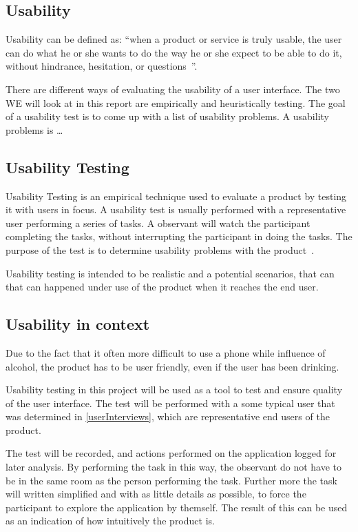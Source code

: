 \subsection{Usability}
\label{sub:usability}

Usability can be defined as: \enquote{when a product or service is truly usable, the user can do what he or she wants to do the way he or she expect to be able to do it, without hindrance, hesitation, or questions~\cite{RubinChisnellSpool08}}.

There are different ways of evaluating the usability of a user interface. The two WE will look at in this report are empirically and heuristically testing. The goal of a usability test is to come up with a list of usability problems. A usability problems is \dots {}

\subsection{Usability Testing}
Usability Testing is an empirical technique used to evaluate a product by testing it with users in focus. A usability test is usually performed with a representative user performing a series of tasks. A observant will watch the participant completing the tasks, without interrupting the participant in doing the tasks. The purpose of the test is to determine usability problems with the product~\cite{RubinChisnellSpool08}.


Usability testing is intended to be realistic and a potential scenarios, that can that can happened under use of the product when it reaches the end user.

\subsection{Usability in context}
\label{sub:usability_in_context}

Due to the fact that it often more difficult to use a phone while influence of alcohol, the product has to be user friendly, even if the user has been drinking.

Usability testing in this project will be used as a tool to test and ensure quality of the user interface. The test will be performed with a some typical user that was determined in \cref{userInterviews}, which are representative end users of the product.

The test will be recorded, and actions performed on the application logged for later analysis. By performing the task in this way, the observant do not have to be in the same room as the person performing the task. Further more the task will written simplified and with as little details as possible, to force the participant to explore the application by themself. The result of this can be used as an indication of how intuitively the product is.

